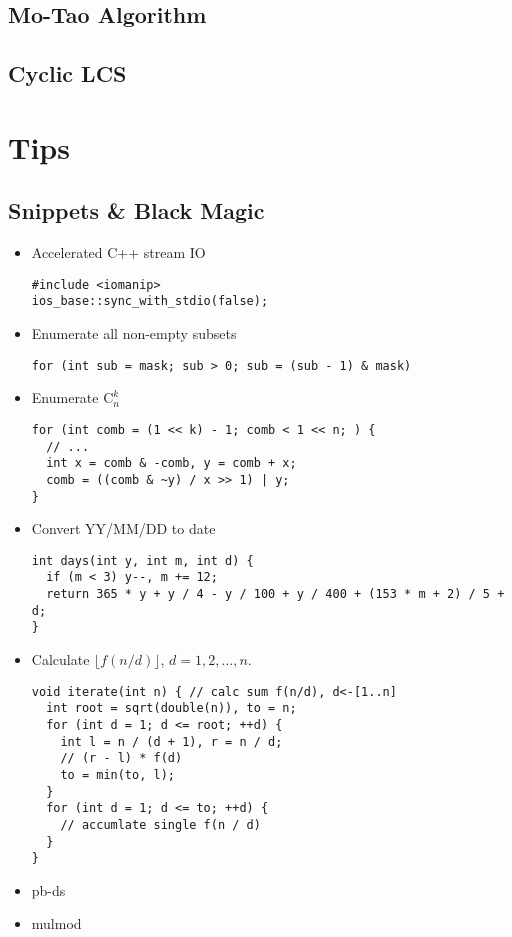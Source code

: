 \documentclass[10pt]{article}
\begin{document}
\subsection{Mo-Tao Algorithm}

\subsection{Cyclic LCS}


\section{Tips}
\subsection{Snippets \& Black Magic}
\begin{itemize}
  \item Accelerated C++ stream IO
    \begin{lstlisting}[frame=none]
#include <iomanip>
ios_base::sync_with_stdio(false);
    \end{lstlisting}
  \item Enumerate all non-empty subsets
    \begin{lstlisting}[frame=none]
for (int sub = mask; sub > 0; sub = (sub - 1) & mask)
    \end{lstlisting}
  \item Enumerate $\mathrm{C}_{n}^{k}$
    \begin{lstlisting}[frame=none]
for (int comb = (1 << k) - 1; comb < 1 << n; ) {
  // ...
  int x = comb & -comb, y = comb + x;
  comb = ((comb & ~y) / x >> 1) | y;
}
    \end{lstlisting}
  \item Convert YY/MM/DD to date
    \begin{lstlisting}[frame=none]
int days(int y, int m, int d) {
  if (m < 3) y--, m += 12;
  return 365 * y + y / 4 - y / 100 + y / 400 + (153 * m + 2) / 5 + d;
}
    \end{lstlisting}
  \item Calculate $\lfloor f(n/d) \rfloor$, $d=1, 2, \ldots, n$.
    \begin{lstlisting}[frame=none]
void iterate(int n) { // calc sum f(n/d), d<-[1..n]
  int root = sqrt(double(n)), to = n;
  for (int d = 1; d <= root; ++d) {
    int l = n / (d + 1), r = n / d;
    // (r - l) * f(d)
    to = min(to, l);
  }
  for (int d = 1; d <= to; ++d) {
    // accumlate single f(n / d)
  }
}
    \end{lstlisting}
  \item pb-ds
    
  \item mulmod
    
\end{itemize}
\end{document}
